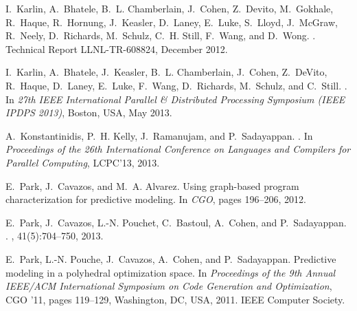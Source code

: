 \documentclass{sig-alternate}
\begin{document}
\begin{thebibliography}{10}
I.~Karlin, A.~Bhatele, B.~L. Chamberlain, J.~Cohen, Z.~Devito, M.~Gokhale,       
  R.~Haque, R.~Hornung, J.~Keasler, D.~Laney, E.~Luke, S.~Lloyd, J.~McGraw,      
  R.~Neely, D.~Richards, M.~Schulz, C.~H. Still, F.~Wang, and D.~Wong.           
.             
\newblock Technical Report LLNL-TR-608824, December 2012.    

I.~Karlin, A.~Bhatele, J.~Keasler, B.~L. Chamberlain, J.~Cohen, Z.~DeVito,       
  R.~Haque, D.~Laney, E.~Luke, F.~Wang, D.~Richards, M.~Schulz, and C.~Still.    
.                                                          
\newblock In {\em 27th IEEE International Parallel \& Distributed Processing     
  Symposium (IEEE IPDPS 2013)}, Boston, USA, May 2013.                           
                                                                                 
A.~Konstantinidis, P.~H. Kelly, J.~Ramanujam, and P.~Sadayappan.                 
.             
\newblock In {\em Proceedings of the 26th International Conference on Languages  
  and Compilers for Parallel Computing}, LCPC'13, 2013.                          
                                                                                 
E.~Park, J.~Cavazos, and M.~A. Alvarez.                                          
\newblock Using graph-based program characterization for predictive modeling.    
\newblock In {\em CGO}, pages 196--206, 2012.                                    
                                                                                 
E.~Park, J.~Cavazos, L.-N. Pouchet, C.~Bastoul, A.~Cohen, and P.~Sadayappan.     
.              
, 41(5):704--750,   
  2013.               

E.~Park, L.-N. Pouche, J.~Cavazos, A.~Cohen, and P.~Sadayappan.                  
\newblock Predictive modeling in a polyhedral optimization space.                
\newblock In {\em Proceedings of the 9th Annual IEEE/ACM International           
  Symposium on Code Generation and Optimization}, CGO '11, pages 119--129,       
  Washington, DC, USA, 2011. IEEE Computer Society.                              
                                                                                 

\end{thebibliography}
\end{document}
